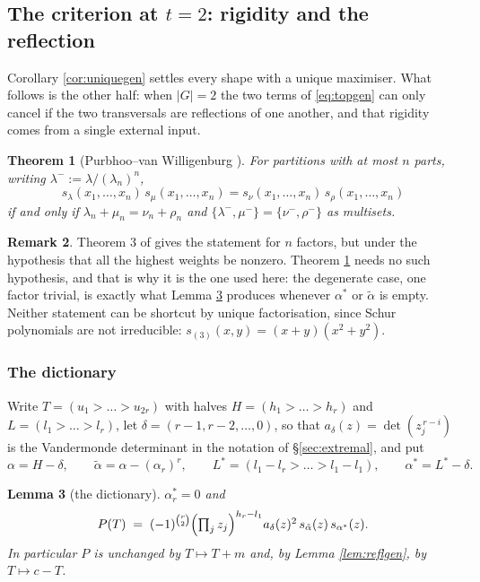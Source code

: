\documentclass[11pt,reqno]{amsart}
\theoremstyle{plain}
\newtheorem{theorem}{Theorem}[section]
\newtheorem{lemma}[theorem]{Lemma}
\theoremstyle{definition}
\newtheorem{remark}[theorem]{Remark}
\begin{document}
\subsection{The criterion at \texorpdfstring{$t=2$}{t=2}: rigidity and the reflection}\label{sec:rigidity}

Corollary \ref{cor:uniquegen} settles every shape with a unique maximiser. What follows is the other
half: when $|G|=2$ the two terms of \eqref{eq:topgen} can only cancel if the two transversals are
reflections of one another, and that rigidity comes from a single external input.

\begin{theorem}[Purbhoo--van Willigenburg {\cite[Thm.~2.5]{PvW}}]\label{thm:PvW}
For partitions with at most $n$ parts, writing $\lambda^{-}:=\lambda/(\lambda_n)^{n}$,
\[
  s_\lambda(x_1,\dots,x_n)\,s_\mu(x_1,\dots,x_n)=s_\nu(x_1,\dots,x_n)\,s_\rho(x_1,\dots,x_n)
\]
if and only if $\lambda_n+\mu_n=\nu_n+\rho_n$ and $\{\lambda^{-},\mu^{-}\}=\{\nu^{-},\rho^{-}\}$ as
multisets.
\end{theorem}

\begin{remark}
Theorem 3 of \cite{Rajan} gives the statement for $n$ factors, but under the hypothesis that all the
highest weights be nonzero. Theorem \ref{thm:PvW} needs no such hypothesis, and that is why it is the
one used here: the degenerate case, one factor trivial, is exactly what Lemma \ref{lem:dictgen}
produces whenever $\alpha^{*}$ or $\tilde\alpha$ is empty. Neither statement can be shortcut by unique
factorisation, since Schur polynomials are not irreducible: $s_{(3)}(x,y)=(x+y)(x^2+y^2)$.
\end{remark}

\subsubsection*{The dictionary}

Write $T=(u_1>\dots>u_{2r})$ with halves $H=(h_1>\dots>h_r)$ and $L=(l_1>\dots>l_r)$, let
$\delta=(r-1,r-2,\dots,0)$, so that $a_\delta(z)=\det(z_j^{\,r-i})$ is the Vandermonde determinant in
the notation of \S\ref{sec:extremal}, and put
\[
  \alpha=H-\delta,\qquad \tilde\alpha=\alpha-(\alpha_r)^{r},\qquad
  L^{*}=(l_1-l_r>\dots>l_1-l_1),\qquad \alpha^{*}=L^{*}-\delta .
\]

\begin{lemma}[the dictionary]\label{lem:dictgen}
$\alpha^{*}_r=0$ and
\begin{equation}\label{eq:dictgen}
  P(T)\;=\;(-1)^{\binom r2}\Bigl(\textstyle\prod_j z_j\Bigr)^{h_r-l_1}
  a_\delta(z)^2\,s_{\tilde\alpha}(z)\,s_{\alpha^{*}}(z).
\end{equation}
In particular $P$ is unchanged by $T\mapsto T+m$ and, by Lemma \ref{lem:reflgen}, by $T\mapsto c-T$.
\end{lemma}
\end{document}
